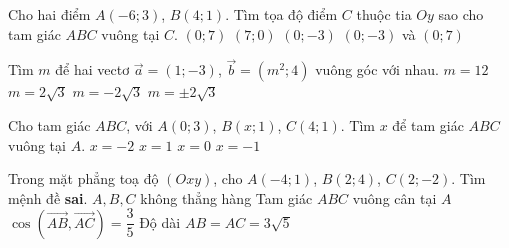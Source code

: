 \begin{ex}%
	Cho hai điểm $A(-6;3)$, $B(4;1)$. Tìm tọa độ điểm $C$ thuộc tia $Oy$ sao cho tam giác $ABC$ vuông tại $C$.
	\choice
	{\True $(0;7)$}
	{$(7;0)$}
	{$(0;-3)$}
	{$(0;-3)$ và $(0;7)$}
\end{ex}

\begin{ex}%
	Tìm $m$ để hai vectơ $\overrightarrow{a}=(1;-3)$, $\overrightarrow{b}=(m^2;4)$ vuông góc với nhau.
	\choice
	{$m=12$}
	{$m=2\sqrt{3}$}
	{$m=-2\sqrt{3}$}
	{\True $m=\pm 2\sqrt{3}$}
\end{ex}

\begin{ex}%
	Cho tam giác $ABC$, với $A(0;3)$, $B(x;1)$, $C(4;1)$. Tìm $x$ để tam giác $ABC$ vuông tại $A$.
	\choice
	{$x=-2$}
	{$x=1$}
	{$x=0$ }
	{\True $x=-1$ }
\end{ex}

\begin{ex}%
	Trong mặt phẳng toạ độ $(Oxy)$, cho $A(-4;1)$, $B(2;4)$, $C(2;-2)$. Tìm mệnh đề \textbf{sai}.
	\choice
	{$A, B, C$ không thẳng hàng}
	{\True Tam giác $ABC$ vuông cân tại $A$}
	{$\cos \left(\overrightarrow{AB}, \overrightarrow{AC}\right)=\dfrac{3}{5}$}
	{Độ dài $AB=AC=3\sqrt{5}$}
\end{ex}

